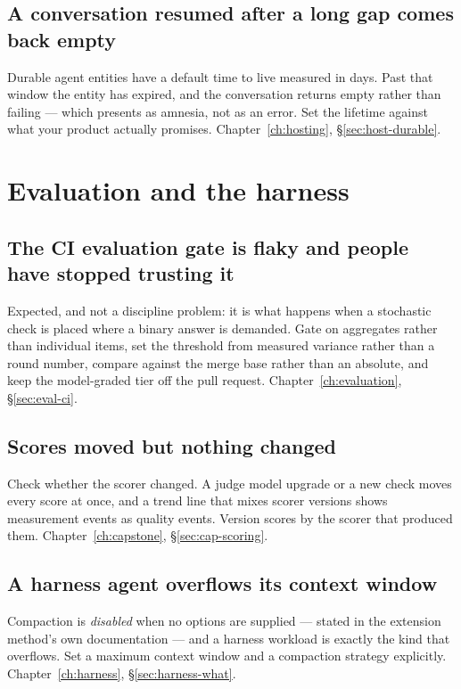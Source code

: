 \subsection{A conversation resumed after a long gap comes back empty}

Durable agent entities have a default time to live measured in days. Past that
window the entity has expired, and the conversation returns empty rather than
failing --- which presents as amnesia, not as an error. Set the lifetime against
what your product actually promises. Chapter~\ref{ch:hosting},
\S\ref{sec:host-durable}.

\section{Evaluation and the harness}

\subsection{The CI evaluation gate is flaky and people have stopped trusting it}

Expected, and not a discipline problem: it is what happens when a stochastic
check is placed where a binary answer is demanded. Gate on aggregates rather
than individual items, set the threshold from measured variance rather than a
round number, compare against the merge base rather than an absolute, and keep
the model-graded tier off the pull request. Chapter~\ref{ch:evaluation},
\S\ref{sec:eval-ci}.

\subsection{Scores moved but nothing changed}

Check whether the scorer changed. A judge model upgrade or a new check moves
every score at once, and a trend line that mixes scorer versions shows
measurement events as quality events. Version scores by the scorer that produced
them. Chapter~\ref{ch:capstone}, \S\ref{sec:cap-scoring}.

\subsection{A harness agent overflows its context window}

Compaction is \emph{disabled} when no options are supplied --- stated in the
extension method's own documentation --- and a harness workload is exactly the
kind that overflows. Set a maximum context window and a compaction strategy
explicitly. Chapter~\ref{ch:harness}, \S\ref{sec:harness-what}.

